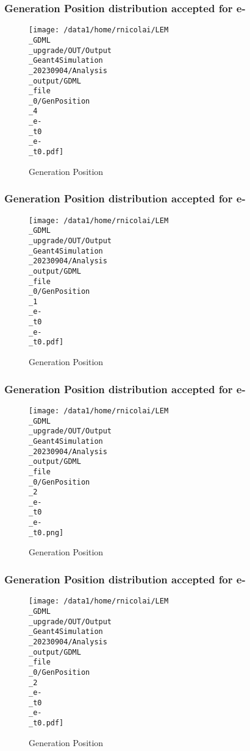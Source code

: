 \documentclass[8pt]{beamer}
\begin{document}
            \begin{frame}
                \frametitle{Generation Position distribution accepted for e-}
            
        \begin{figure}[h]
            \centering
            \texttt{[image: /data1/home/rnicolai/LEM\\\_GDML\\\_upgrade/OUT/Output\\\_Geant4Simulation\\\_20230904/Analysis\\\_output/GDML\\\_file\\\_0/GenPosition\\\_4\\\_e-\\\_t0\\\_e-\\\_t0.pdf]}
            \caption{Generation Position}
        \end{figure}
        
            \end{frame}
            
            \begin{frame}
                \frametitle{Generation Position distribution accepted for e-}
            
        \begin{figure}[h]
            \centering
            \texttt{[image: /data1/home/rnicolai/LEM\\\_GDML\\\_upgrade/OUT/Output\\\_Geant4Simulation\\\_20230904/Analysis\\\_output/GDML\\\_file\\\_0/GenPosition\\\_1\\\_e-\\\_t0\\\_e-\\\_t0.pdf]}
            \caption{Generation Position}
        \end{figure}
        
            \end{frame}
            
            \begin{frame}
                \frametitle{Generation Position distribution accepted for e-}
            
        \begin{figure}[h]
            \centering
            \texttt{[image: /data1/home/rnicolai/LEM\\\_GDML\\\_upgrade/OUT/Output\\\_Geant4Simulation\\\_20230904/Analysis\\\_output/GDML\\\_file\\\_0/GenPosition\\\_2\\\_e-\\\_t0\\\_e-\\\_t0.png]}
            \caption{Generation Position}
        \end{figure}
        
            \end{frame}
            
            \begin{frame}
                \frametitle{Generation Position distribution accepted for e-}
            
        \begin{figure}[h]
            \centering
            \texttt{[image: /data1/home/rnicolai/LEM\\\_GDML\\\_upgrade/OUT/Output\\\_Geant4Simulation\\\_20230904/Analysis\\\_output/GDML\\\_file\\\_0/GenPosition\\\_2\\\_e-\\\_t0\\\_e-\\\_t0.pdf]}
            \caption{Generation Position}
        \end{figure}
        
            \end{frame}
            
\end{document}

